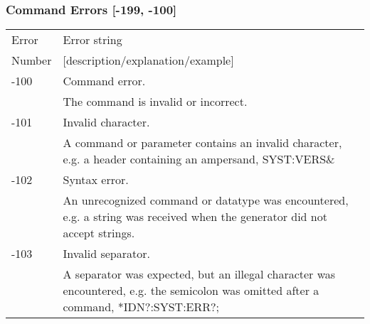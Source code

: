 \subsubsection{Command Errors [-199, -100]}

\begin{longtable}{|l|p{25em}|}
\hline
Error			& Error string \\ 
Number		& [description/explanation/example] \\ \hline
-100			& Command error.  \\ \cline{2-2}
					& The command is invalid or incorrect. \\ \hline
-101			& Invalid character. \\ \cline{2-2}
					& A command or parameter contains an invalid character, e.g. a header containing an ampersand,
SYST:VERS\&\\ \hline
-102			& Syntax error. \\ \cline{2-2}
					& An unrecognized command or datatype was encountered, e.g. a string was received when the generator did not accept strings.\\ \hline
-103			& Invalid separator.\\ \cline{2-2}
					& A separator was expected, but an illegal character was encountered, e.g. the semicolon was omitted after a command, *IDN?:SYST:ERR?;\\ \hline
					

\end{longtable}
